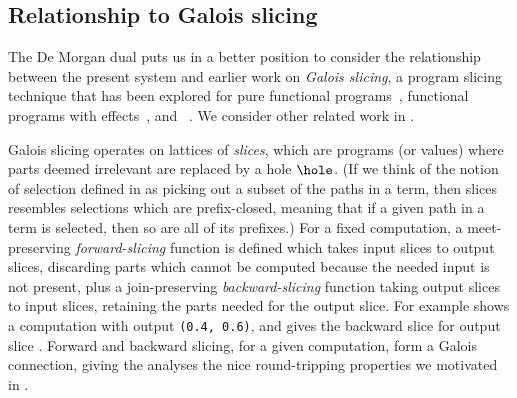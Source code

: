\subsection{Relationship to Galois slicing}
\label{sec:de-morgan:galois-slicing}



The De Morgan dual puts us in a better position to consider the relationship between the present system and earlier work on \emph{Galois slicing}, a program slicing technique that has been explored for pure functional programs~\cite{perera12a,perera13}, functional programs with effects~\cite{ricciotti17}, and \piCalculus~\cite{perera16d}. We consider other related work in .

Galois slicing operates on lattices of \emph{slices}, which are programs (or values) where parts deemed irrelevant are replaced by a hole $\hole$. (If we think of the notion of selection defined in  as picking out a subset of the paths in a term, then slices resembles selections which are prefix-closed, meaning that if a given path in a term is selected, then so are all of its prefixes.) For a fixed computation, a meet-preserving \emph{forward-slicing} function is defined which takes input slices to output slices, discarding parts which cannot be computed because the needed input is not present, plus a join-preserving \emph{backward-slicing} function taking output slices to input slices, retaining the parts needed for the output slice. For example  shows a computation with output \lstinline{(0.4, 0.6)}, and  gives the backward slice for output slice . Forward and backward slicing, for a given computation, form a Galois connection, giving the analyses the nice round-tripping properties we motivated in .

